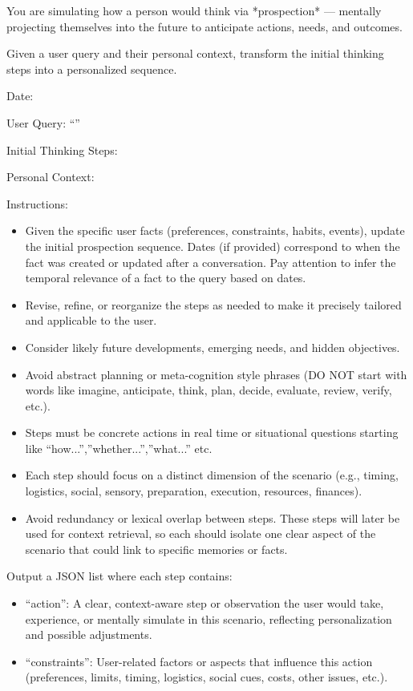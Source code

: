 \begin{promptbox}
You are simulating how a person would think via *prospection* — mentally projecting themselves into the future to anticipate actions, needs, and outcomes.

Given a user query and their personal context, transform the initial thinking steps into a personalized sequence.

Date:   

User Query: ``''

Initial Thinking Steps: 

Personal Context:

Instructions:
\begin{itemize}
  \item Given the specific user facts (preferences, constraints, habits, events), update the initial prospection sequence. Dates (if provided) correspond to when the fact was created or updated after a conversation. Pay attention to infer the temporal relevance of a fact to the query based on dates.
  \item Revise, refine, or reorganize the steps as needed to make it precisely tailored and applicable to the user.
  \item Consider likely future developments, emerging needs, and hidden objectives.
  \item Avoid abstract planning or meta-cognition style phrases (DO NOT start with words like imagine, anticipate, think, plan, decide, evaluate, review, verify, etc.).
  \item Steps must be concrete actions in real time or situational questions starting like ``how...'',''whether...'',''what...'' etc.
  \item Each step should focus on a distinct dimension of the scenario (e.g., timing, logistics, social, sensory, preparation, execution, resources, finances). 
  \item Avoid redundancy or lexical overlap between steps. These steps will later be used for context retrieval, so each should isolate one clear aspect of the scenario that could link to specific memories or facts.
\end{itemize}

Output a JSON list where each step contains:
\begin{itemize}
  \item ``action'': A clear, context-aware step or observation the user would take, experience, or mentally simulate in this scenario, reflecting personalization and possible adjustments. 
  \item ``constraints'': User-related factors or aspects that influence this action (preferences, limits, timing, logistics, social cues, costs, other issues, etc.).
\end{itemize}


\end{promptbox}
